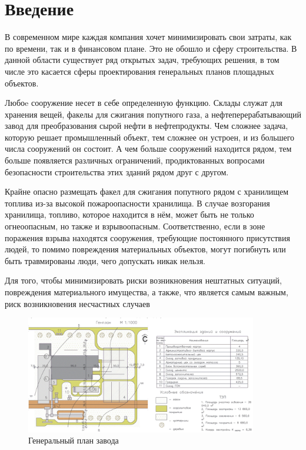 \section*{\Large{Введение}}
В современном мире каждая компания хочет минимизировать свои
затраты, как по времени, так и в финансовом плане.
Это не обошло и сферу строительства.
В данной области существует ряд открытых задач, требующих решения,
в том числе это касается сферы проектирования генеральных планов площадных объектов.


Любоe сооружение несет в себе определенную функцию. Склады служат для хранения вещей, факелы для сжигания
попутного газа, а нефтеперерабатывающий завод для преобразования сырой нефти в нефтепродукты.
Чем сложнее задача, которую решает промышленный объект,
тем сложнее он устроен, и из большего числа сооружений он состоит.
А чем больше сооружений находится рядом, тем больше появляется различных ограничений,
продиктованных вопросами безопасности строительства этих зданий рядом друг с другом.


Крайне опасно размещать факел для сжигания попутного рядом с хранилищем топлива из-за высокой пожароопасности хранилища.
В случае возгорания хранилища, топливо, которое находится в нём, может быть не только огнеоопасным, но также
и взрывоопасным. Соответственно, если в зоне поражения взрыва находятся сооружения, требующие постоянного присутствия людей,
то помимо повреждения материальных объектов, могут погибнуть или быть травмированы люди, чего допускать никак нельзя.



Для того, чтобы минимизировать риски возникновения нештатных ситуаций, повреждения материального имущества, а также, что
является самым важным, риск возникновения несчастных случаев


\par
\begin{figure}[H]
	\includegraphics[width=0.9\textwidth]{images/introduction/1}
	\caption{Генеральный план завода}
	\label{pic:introduction__site_plan}
\end{figure}
\par

